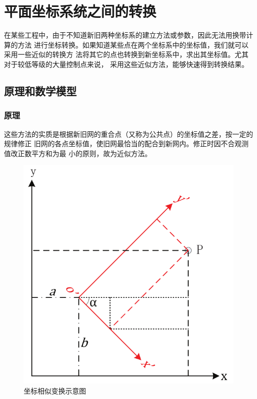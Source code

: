 ﻿%

\chapter{平面坐标系统之间的转换}

在某些工程中，由于不知道新旧两种坐标系的建立方法或参数，因此无法用换带计算的方法
进行坐标转换。如果知道某些点在两个坐标系中的坐标值，我们就可以采用一些近似的转换方
法将其它的点也转换到新坐标系中，求出其坐标值。尤其对于较低等级的大量控制点来说，
采用这些近似方法，能够快速得到转换结果。

 \section{原理和数学模型}

\subsection{原理}
这些方法的实质是根据新旧网的重合点（又称为公共点）的坐标值之差，按一定的规律修正
旧网的各点坐标值，使旧网最恰当的配合到新网内。修正时因不合观测值改正数平方和为最
小的原则，故为近似方法。

\begin{figure}[htbp]
    \centering
    \includegraphics[scale=0.6]{xytoxy/xytoxy.png}
    \caption{坐标相似变换示意图}
    \label{fig:xytoxy}
\end{figure}

